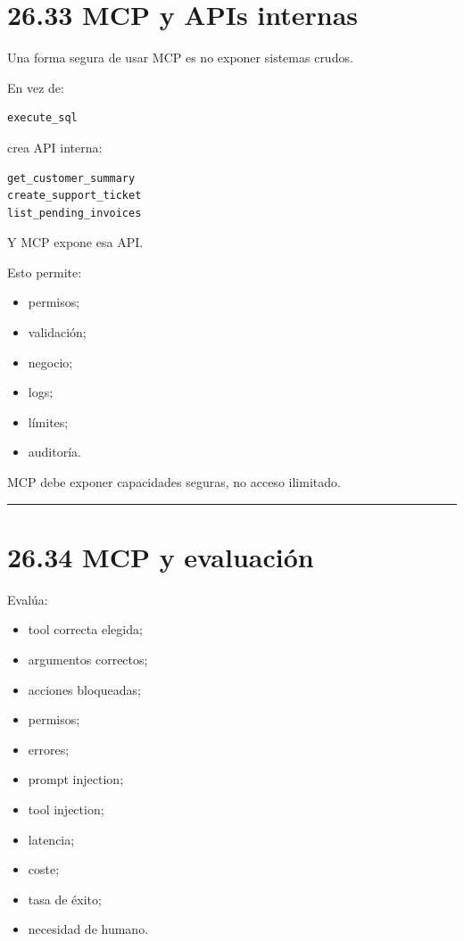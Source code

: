 \section{26.33 MCP y APIs internas}\label{mcp-y-apis-internas}

Una forma segura de usar MCP es no exponer sistemas crudos.

En vez de:

\begin{lstlisting}
execute_sql
\end{lstlisting}

crea API interna:

\begin{lstlisting}
get_customer_summary
create_support_ticket
list_pending_invoices
\end{lstlisting}

Y MCP expone esa API.

Esto permite:

\begin{itemize}
\tightlist
\item
  permisos;
\item
  validación;
\item
  negocio;
\item
  logs;
\item
  límites;
\item
  auditoría.
\end{itemize}

MCP debe exponer capacidades seguras, no acceso ilimitado.

\begin{center}\rule{0.5\linewidth}{0.5pt}\end{center}

\section{26.34 MCP y evaluación}\label{mcp-y-evaluaciuxf3n}

Evalúa:

\begin{itemize}
\tightlist
\item
  tool correcta elegida;
\item
  argumentos correctos;
\item
  acciones bloqueadas;
\item
  permisos;
\item
  errores;
\item
  prompt injection;
\item
  tool injection;
\item
  latencia;
\item
  coste;
\item
  tasa de éxito;
\item
  necesidad de humano.
\end{itemize}

